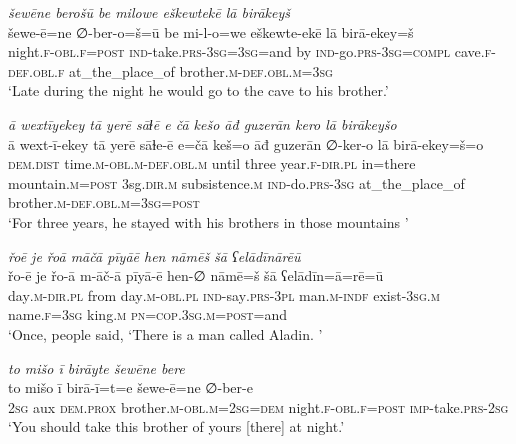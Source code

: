 \ea \label{DG.19}
\textit{šewēne berošū be milowe eškewtekē lā birākeyš} \\ 
\gll šewe-ē=ne ∅-ber-o=š=ū be mi-l-o=we eškewte-ekē lā birā-ekey=š \\ 
 night\textsc{\textsc{.f}}\textsc{-obl}\textsc{\textsc{.f}}\textsc{=\textsc{post}} \textsc{ind-}take\textsc{.prs}\textsc{-3sg}\textsc{=3sg}=and by \textsc{ind-}go\textsc{.prs}\textsc{-3sg}\textsc{=\textsc{compl}} cave\textsc{\textsc{.f}}\textsc{-def}\textsc{.obl}\textsc{\textsc{.f}} at\_the\_place\_of brother\textsc{.m}\textsc{-def}\textsc{.obl}\textsc{.m}\textsc{=3sg} \\ 
\glt `Late during the night he would go to the cave to his brother.'
\z 
 
\ea \label{DG.21}
\textit{ā wextīyekey tā yerē sāɫē e čā kešo āđ guzerān kero lā birākeyšo} \\ 
\gll ā wext-ī-ekey tā yerē sāɫe-ē e=čā keš=o āđ guzerān ∅-ker-o lā birā-ekey=š=o \\ 
 \textsc{dem.dist} time\textsc{.m}\textsc{-obl}\textsc{.m}\textsc{-def}\textsc{.obl}\textsc{.m} until three year\textsc{\textsc{.f}}\textsc{-dir}\textsc{.pl} in=there mountain\textsc{.m}\textsc{=\textsc{post}} 3sg\textsc{.dir}\textsc{.m} subsistence\textsc{.m} \textsc{ind-}do\textsc{.prs}\textsc{-3sg} at\_the\_place\_of brother\textsc{.m}\textsc{-def}\textsc{.obl}\textsc{.m}\textsc{=3sg}\textsc{=\textsc{post}} \\ 
\glt `For three years, he stayed with his brothers in those mountains '
\z 
 
\ea \label{DG.24}
\textit{řoē je řoā māčā pīyāē hen nāmēš šā ʕelādīnārēū} \\ 
\gll řo-ē je řo-ā m-āč-ā pīyā-ē hen-∅ nāmē=š šā ʕelādīn=ā=rē=ū \\ 
 day\textsc{.m}\textsc{-dir}\textsc{.pl} from day\textsc{.m}\textsc{-obl}\textsc{.pl} \textsc{ind-}say\textsc{.prs}\textsc{-3pl} man\textsc{.m}\textsc{-indf} exist\textsc{-3sg}\textsc{.m} name\textsc{\textsc{.f}}\textsc{=3sg} king\textsc{.m} \textsc{pn}\textsc{=cop}\textsc{.3sg}\textsc{.m}\textsc{=\textsc{post}}=and \\ 
\glt `Once, people said, ‘There is a man called Aladin. '
\z 
 
\ea \label{DG.26}
\textit{to mišo ī birāyte šewēne bere} \\ 
\gll to mišo ī birā-ī=t=e šewe-ē=ne ∅-ber-e \\ 
 \textsc{2sg} aux \textsc{dem.prox} brother\textsc{.m}\textsc{-obl}\textsc{.m}\textsc{=\textsc{2sg}}\textsc{=dem} night\textsc{\textsc{.f}}\textsc{-obl}\textsc{\textsc{.f}}\textsc{=\textsc{post}} \textsc{imp-}take\textsc{.prs}-\textsc{2sg} \\ 
\glt `You should take this brother of yours [there] at night.'
\z 
 
